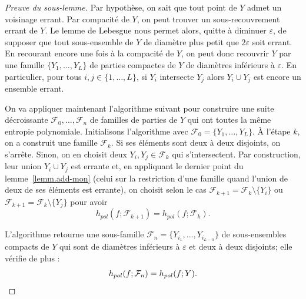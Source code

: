 \documentclass[11pt]{article}
\theoremstyle{definition}
\numberwithin{equation}{section}
\numberwithin{figure}{section}
\numberwithin{table}{section}
\newcommand*\cF{{\mathcal F}}
\begin{document}
\begin{proof}[Preuve du sous-lemme]
Par hypothèse, on sait que tout point de $Y$ admet un voisinage errant. Par compacité de $Y$, on peut trouver un sous-recouvrement errant de $Y$. Le lemme de Lebesgue nous permet alors, quitte à diminuer $\varepsilon$, de supposer que tout sous-ensemble de $Y$ de diamètre plus petit que $2\varepsilon$ soit errant. En recourant encore une fois à la compacité de $Y$, on peut donc recouvrir $Y$ par une famille $\{ Y_1, \dots,Y_L\}$ {de parties compactes de $Y$} de diamètres inférieurs à $\varepsilon$. {En particulier,} pour tous $i,j \in \{1, \dots, L\}$, si $Y_i$ intersecte $Y_j$ alors $Y_i \cup Y_j$ est encore un ensemble errant.

On va appliquer maintenant l'algorithme suivant pour construire une suite décroissante $\cF_0, \dots, \cF_n$ de familles {de parties} de $Y$ qui ont toutes la même entropie polynomiale. Initialisons l'algorithme avec $\cF_0 =
\{ Y_1, \dots,Y_L\}$. \`A l'étape $k$, on a construit une famille $\cF_k$. Si ses éléments sont deux à deux disjoints, on s'arrête. Sinon, on en choisit deux $Y_i, Y_j \in \cF_k$ qui s'intersectent. Par construction, leur union $Y_i \cup Y_j$ est errante et, en appliquant le dernier point du lemme~\ref{lemm.add-mon} (celui sur la restriction d'une famille quand l'union de deux de ses éléments est errante), on choisit selon le cas $\cF_{k+1} = \cF_k \setminus \{ Y_i\}$ ou $\cF_{k+1} = \cF_k \setminus \{ Y_j\}$ pour avoir
\[
h_{pol}(f;\cF_{k+1}) = h_{pol}(f;\cF_{k}).
\]

L'algorithme retourne une sous-famille $\cF_n = \{Y_{i_1}, \dots, Y_{i_{L-n}}\}$ de sous-ensembles compacts de $Y$ qui sont de diamètres inférieurs à $\varepsilon$ et deux à deux disjoints; elle vérifie de plus :
\[
h_{pol}(f;\cF_n) = h_{pol}(f;Y).\qedhere
\]
\end{proof}
\end{document}
